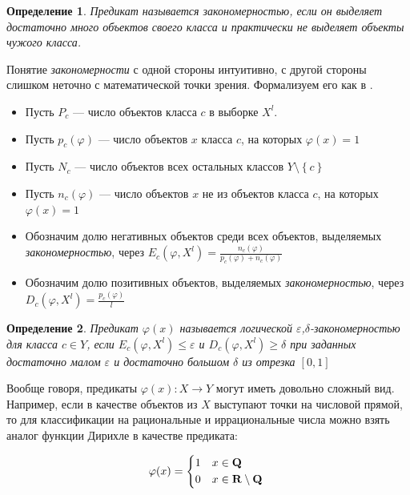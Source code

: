\documentclass[12pt]{article}
\newtheorem{definition}{Определение}
\begin{document}
\begin{definition}
  Предикат называется \emph{закономерностью}, если он выделяет
  достаточно много объектов своего класса и практически не выделяет
  объекты чужого класса.
\end{definition}

Понятие \emph{закономерности} с одной стороны интуитивно, с другой
стороны слишком неточно с математической точки зрения. Формализуем его
как в \cite{voron10logicalgs}.

\begin{itemize}
\item Пусть \(P_c\) --- число объектов класса \(c\) в выборке \(X^l\).
\item Пусть \(p_c(\varphi)\) --- число объектов \(x\) класса \(c\), на
  которых \(\varphi(x) = 1\)
\item Пусть \(N_c\) --- число объектов всех остальных классов \(Y
  \setminus \left\{c\right\}\)
\item Пусть \(n_c(\varphi)\) --- число объектов \(x\) не из объектов
  класса \(c\), на которых \(\varphi(x) = 1\)
\item Обозначим долю негативных объектов среди всех объектов,
  выделяемых \emph{закономерностью}, через \(E_c(\varphi, X^l) =
  \frac{n_c(\varphi)}{p_c(\varphi) + n_c(\varphi)}\)
\item Обозначим долю позитивных объектов, выделяемых
  \emph{закономерностью}, через \(D_c(\varphi, X^l) =
  \frac{p_c(\varphi)}{l}\)
\end{itemize}

\begin{definition}
  Предикат \(\varphi(x)\) называется \emph{логической
    \(\varepsilon\),\(\delta\)-закономерностью} для класса \(c \in
  Y\), если \(E_c(\varphi, X^l) \leq \varepsilon \) и \(D_c(\varphi,
  X^l)\geq\delta\) при заданных достаточно малом \(\varepsilon\) и
  достаточно большом \(\delta\) из отрезка \([0, 1]\)
\end{definition}

Вообще говоря, предикаты \(\varphi(x)\colon X \rightarrow Y\) могут
иметь довольно сложный вид. Например, если в качестве объектов из
\(X\) выступают точки на числовой прямой, то для классификации на
рациональные и иррациональные числа можно взять аналог функции Дирихле
в качестве предиката:

\[
\varphi(x) =
\begin{dcases*}
1 & \(x \in \mathbf{Q}\) \\
0 & \(x \in \mathbf{R} \setminus \mathbf{Q}\)
\end{dcases*}
\]
\end{document}
